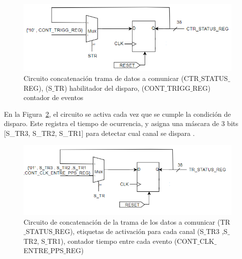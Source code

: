 \begin{figure}[h!]
\includegraphics[scale=0.9]{Figs/ctr_status.PNG} 
\centering
\caption[Circuito concatenación trama de datos a comunicar protocolo SPI]{Circuito concatenación trama de datos a comunicar (CTR$\_$STATUS$\_$REG), (S$\_$TR) habilitador  del disparo, (CONT$\_$TRIGG$\_$REG) contador de eventos}
\label{eve}
\end{figure}

En la Figura~\ref{flancos}, el circuito se activa cada vez que se cumple la condición de disparo. Este registra el tiempo de ocurrencia, y asigna una máscara de 3 bits [S\_TR3, S\_TR2, S\_TR1] para detectar cual canal se dispara .

\begin{figure}[H]
\includegraphics[scale=0.9]{Figs/tr_status.PNG} 
\centering
\caption[Circuito concatenación trama de datos a comunicar protocolo SPI ]{Circuito de concatenación de la trama de los datos a comunicar (TR$\_$STATUS$\_$REG), etiquetas de activación para cada canal (S$\_$TR3 ,S$\_$TR2, S$\_$TR1), contador tiempo entre cada evento (CONT$\_$CLK$\_$ENTRE$\_$PPS$\_$REG)}
\label{flancos}
\end{figure}

